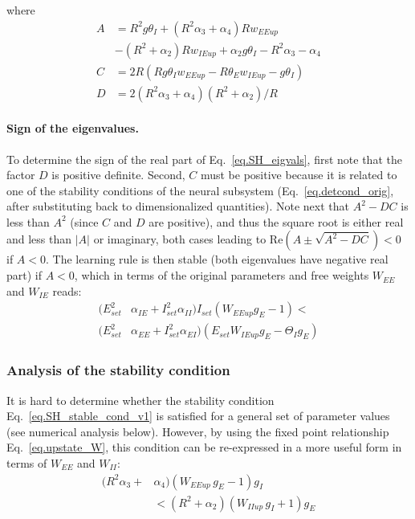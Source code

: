 \documentclass[twocolumn]{article}
\newcommand{\EE}{\mathit{EE}}
\newcommand{\EI}{\mathit{EI}}
\newcommand{\IE}{\mathit{IE}}
\newcommand{\II}{\mathit{II}}
\newcommand{\set}{\mathit{set}}
\newcommand{\up}{\mathit{up}}
\newcommand{\RE}{\mathrm{Re}}
\begin{document}
\noindent where
\begin{equation}
\begin{aligned}
A & = R^2 g \theta_I + (R^2 \alpha_3 + \alpha_4) R w_{\EE\up} \\
& - (R^2 + \alpha_2)R w_{\IE\up} + \alpha_2 g \theta_I - R^2 \alpha_3 - \alpha_4 \\
C & = 2R(R g \theta_I w_{\EE\up} - R \theta_E w_{\IE\up} - g \theta_I) \\
D & = 2(R^2\alpha_3 + \alpha_4)(R^2 + \alpha_2)/R
\end{aligned}
\end{equation}


\paragraph{Sign of the eigenvalues.}

To determine the sign of the real part of Eq.\ \ref{eq.SH_eigvals}, first note that the factor $D$ is positive definite. Second, $C$ must be positive because it is related to one of the stability conditions of the neural subsystem (Eq.\ \ref{eq.detcond_orig}, after substituting back to dimensionalized quantities). Note next that $A^2 - DC$ is less than $A^2$ (since $C$ and $D$ are positive), and thus the square root is either real and less than $|A|$ or imaginary, both cases leading to $\RE(A \pm \sqrt{A^2-DC}) < 0$ if $A<0$. The learning rule is then stable (both eigenvalues have negative real part) if $A<0$, which in terms of the original parameters and free weights $W_{\EE}$ and $W_{\IE}$ reads:
\begin{equation}
\begin{aligned}
(E_{\set}^2 & \alpha_{\IE} + I_{\set}^2 \alpha_{\II}) I_{\set}(W_{\EE\up} g_E - 1) < \\
(E_{\set}^2 & \alpha_{\EE} + I_{\set}^2 \alpha_{\EI}) (E_{\set} W_{\IE\up} g_E - \Theta_I g_E)
\end{aligned}
\label{eq.SH_stable_cond_v1}
\end{equation}


\subsubsection{Analysis of the stability condition}

It is hard to determine whether the stability condition Eq.\ \ref{eq.SH_stable_cond_v1} is satisfied for a general set of parameter values (see numerical analysis below). However, by using the fixed point relationship Eq.\ \ref{eq.upstate_W}, this condition can be re-expressed in a more useful form in terms of $W_{\EE}$ and $W_{\II}$:
\begin{equation}
\begin{aligned}
(R^2 \alpha_3 + & \alpha_4)(W_{\EE\up} \, g_E  - 1)g_I \\
& < (R^2 + \alpha_2)(W_{\II\up} \, g_I + 1)g_E
\end{aligned}
\label{eq.SH_stable_cond_v2}
\end{equation}
\end{document}
